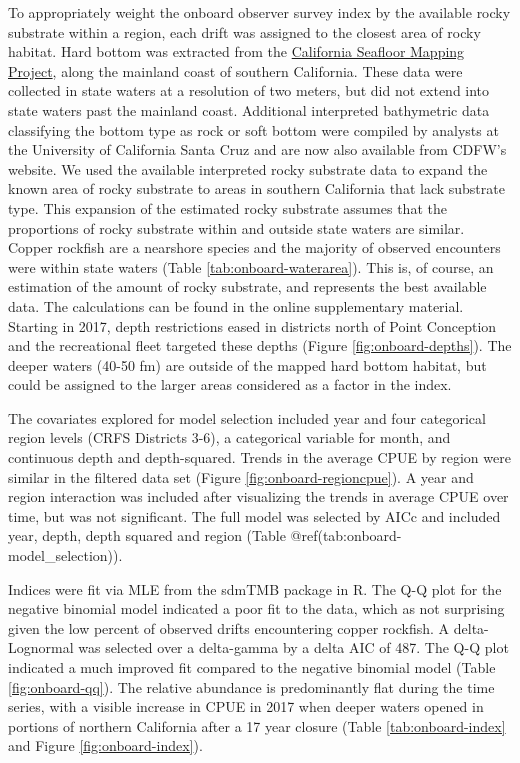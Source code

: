 \documentclass[11pt,
  letterpaper,
]{article}
\begin{document}
To appropriately weight the onboard observer survey index by the available rocky substrate within a region, each drift was assigned to the closest area of rocky habitat. Hard bottom was extracted from the \href{http://seafloor.otterlabs.org/index.html}{California Seafloor Mapping Project}, along the mainland coast of southern California. These data were collected in state waters at a resolution of two meters, but did not extend into state waters past the mainland coast. Additional interpreted bathymetric data classifying the bottom type as rock or soft bottom were compiled by analysts at the University of California Santa Cruz and are now also available from CDFW's website. We used the available interpreted rocky substrate data to expand the known area of rocky substrate to areas in southern California that lack substrate type. This expansion of the estimated rocky substrate assumes that the proportions of rocky substrate within and outside state waters are similar. Copper rockfish are a nearshore species and the majority of observed encounters were within state waters (Table \ref{tab:onboard-waterarea}). This is, of course, an estimation of the amount of rocky substrate, and represents the best available data. The calculations can be found in the online supplementary material. Starting in 2017, depth restrictions eased in districts north of Point Conception and the recreational fleet targeted these depths (Figure \ref{fig:onboard-depths}). The deeper waters (40-50 fm) are outside of the mapped hard bottom habitat, but could be assigned to the larger areas considered as a factor in the index.

The covariates explored for model selection included year and four categorical region levels (CRFS Districts 3-6), a categorical variable for month, and continuous depth and depth-squared. Trends in the average CPUE by region were similar in the filtered data set (Figure \ref{fig:onboard-regioncpue}). A year and region interaction was included after visualizing the trends in average CPUE over time, but was not significant. The full model was selected by AICc and included year, depth, depth squared and region (Table @ref(tab:onboard-model\_selection)).

Indices were fit via MLE from the sdmTMB package in R. The Q-Q plot for the negative binomial model indicated a poor fit to the data, which as not surprising given the low percent of observed drifts encountering copper rockfish. A delta-Lognormal was selected over a delta-gamma by a delta AIC of 487. The Q-Q plot indicated a much improved fit compared to the negative binomial model (Table \ref{fig:onboard-qq}). The relative abundance is predominantly flat during the time series, with a visible increase in CPUE in 2017 when deeper waters opened in portions of northern California after a 17 year closure (Table \ref{tab:onboard-index} and Figure \ref{fig:onboard-index}).
\end{document}
